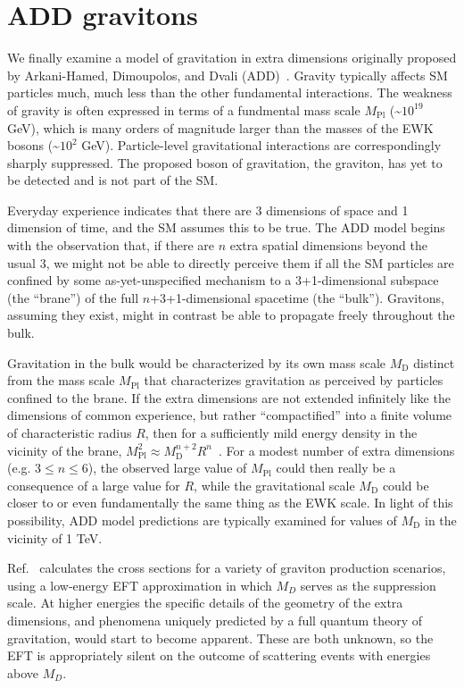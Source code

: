 \documentclass[oneside, letterpaper, 12pt, oldfontcommands]{memoir}
\begin{document}
\section{ADD gravitons} \label{sec:introduction_ADD}
We finally examine a model of gravitation in extra dimensions originally proposed by Arkani-Hamed, Dimoupolos, and Dvali (ADD)~\cite{ref:S0370-2693(98)00466-3}.
Gravity typically affects SM particles much, much less than the other fundamental interactions. The weakness of gravity
is often expressed in terms of a fundmental mass scale $M_\mathrm{Pl}$ (\textasciitilde$10^{19}$ GeV), which is
many orders of magnitude larger than the masses of the EWK bosons (\textasciitilde$10^{2}$ GeV). Particle-level gravitational interactions
are correspondingly sharply suppressed. The proposed boson of gravitation, the graviton, has yet to be detected and is not part of the SM.

Everyday experience indicates that there are 3 dimensions of space and 1 dimension of time, and the SM assumes this to be true.
The ADD model begins with the observation that, if there are $n$ extra spatial dimensions beyond the usual 3,
we might not be able to directly perceive them if all the SM particles are confined by some as-yet-unspecified
mechanism to a 3+1-dimensional subspace (the ``brane'') of the full $n$+3+1-dimensional spacetime (the ``bulk'').
Gravitons, assuming they exist, might in contrast be able to propagate freely throughout the bulk.

Gravitation in the bulk would be characterized by its own mass scale $M_\mathrm{D}$ distinct from the mass scale $M_\mathrm{Pl}$ that
characterizes gravitation as perceived by particles confined to the brane. If the extra dimensions are not extended infinitely like the
dimensions of common experience, but rather ``compactified'' into a finite volume of characteristic radius $R$, then for a sufficiently mild
energy density in the vicinity of the brane, $M_\mathrm{Pl}^{2} \approx M_\mathrm{D}^{n+2} R^{n}$~\cite{ref:S0370-2693(98)00466-3, ref:S0550-3213(99)00044-9}.
For a modest number of extra dimensions (e.g. $3 \leq n \leq 6$), the observed large value of $M_\mathrm{Pl}$ could then really
be a consequence of a large value for $R$, while the gravitational scale $M_\mathrm{D}$ could be closer to or even
fundamentally the same thing as the EWK scale. In light of this possibility, ADD model predictions are typically examined for values of $M_\mathrm{D}$
in the vicinity of 1 TeV.

Ref.~\cite{ref:S0550-3213(99)00044-9} calculates the cross sections for a variety of graviton production scenarios, using a low-energy EFT
approximation in which $M_{D}$ serves as the suppression scale. At higher energies the specific details of the geometry of the extra dimensions,
and phenomena uniquely predicted by a full quantum theory of gravitation, would start to become apparent. These are both unknown, so the EFT
is appropriately silent on the outcome of scattering events with energies above $M_{D}$.
\end{document}
